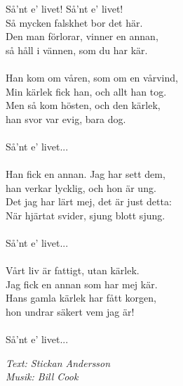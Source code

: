 \vspace{10pt}
Så'nt e' livet! Så'nt e' livet!\\
Så mycken falskhet bor det här.\\
Den man förlorar, vinner en annan,\\
så håll i vännen, som du har kär.\\
\\
Han kom om våren, som om en vårvind,\\
Min kärlek fick han, och allt han tog.\\
Men så kom hösten, och den kärlek,\\
han svor var evig, bara dog.\\
\\
Så'nt e' livet...\\
\\
Han fick en annan. Jag har sett dem,\\
han verkar lycklig, och hon är ung.\\
Det jag har lärt mej, det är just detta:\\
När hjärtat svider, sjung blott sjung.\\
\\
Så'nt e' livet...\\
\\
Vårt liv är fattigt, utan kärlek.\\
Jag fick en annan som har mej kär.\\
Hans gamla kärlek har fått korgen,\\
hon undrar säkert vem jag är!\\
\\
Så'nt e' livet...
\par
\vspace{10pt}
{\footnotesize\textit{Text: Stickan Andersson\\Musik: Bill Cook}}
